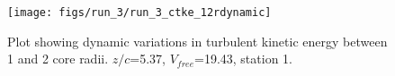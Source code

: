 \begin{figure}[H]
\centering
\texttt{[image: figs/run\_3/run\_3\_ctke\_12rdynamic]}
\caption{Plot showing dynamic variations in turbulent kinetic energy between 1 and 2 core radii. $z/c$=5.37, $V_{free}$=19.43, station 1.}
\label{fig:run_3_ctke_12rdynamic}
\end{figure}


